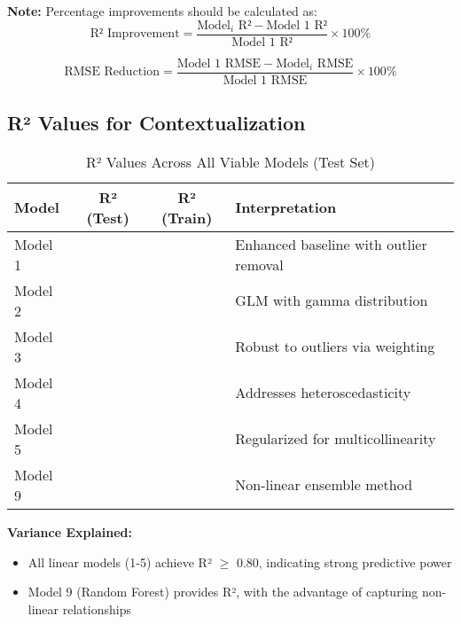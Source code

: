 \textbf{Note:} Percentage improvements should be calculated as:
\begin{equation}
\text{R² Improvement} = \frac{\text{Model}_i\text{ R²} - \text{Model 1 R²}}{\text{Model 1 R²}} \times 100\%
\end{equation}

\begin{equation}
\text{RMSE Reduction} = \frac{\text{Model 1 RMSE} - \text{Model}_i\text{ RMSE}}{\text{Model 1 RMSE}} \times 100\%
\end{equation}


\subsection{R² Values for Contextualization}

\begin{table}[h!]
\centering
\caption{R² Values Across All Viable Models (Test Set)}
\label{tab:r2_comparison}
\begin{tabular}{lccl}
\toprule
\textbf{Model} & \textbf{R² (Test)} & \textbf{R² (Train)} & \textbf{Interpretation} \\
\midrule
Model 1 & \ModelOneRSquaredTest{} & \ModelOneRSquaredTrain{} & Enhanced baseline with outlier removal \\
Model 2 & \ModelTwoRSquaredTest{} & \ModelTwoRSquaredTrain{} & GLM with gamma distribution \\
Model 3 & \ModelThreeRSquaredTest{} & \ModelThreeRSquaredTrain{} & Robust to outliers via weighting \\
Model 4 & \ModelFourRSquaredTest{} & \ModelFourRSquaredTrain{} & Addresses heteroscedasticity \\
Model 5 & \ModelFiveRSquaredTest{} & \ModelFiveRSquaredTrain{} & Regularized for multicollinearity \\
Model 9 & \ModelNineRSquaredTest{} & \ModelNineRSquaredTrain{} & Non-linear ensemble method \\
\bottomrule
\end{tabular}
\end{table}

\textbf{Variance Explained:}
\begin{itemize}
    \item All linear models (1-5) achieve R² $\geq$ 0.80, indicating strong predictive power
    \item Model 9 (Random Forest) provides \ModelNineRSquaredTest{} R², with the advantage of capturing non-linear relationships
\end{itemize}

